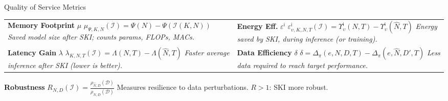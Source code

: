 \documentclass[presentation]{beamer}\mode<presentation>{\usetheme{AMSBolognaFC}}
\begin{document}
\begin{frame}[c]{Quality of Service Metrics~}

    \small
    \vspace{-2ex}
    \begin{tabular}{p{} p{}}
    \textbf{Memory Footprint} $\mu$ \newline
    $\mu_{\Psi, K, N}(\mathcal{I}) = \Psi(N) - \Psi(\mathcal{I}(K, N))$ \newline
    \footnotesize
    \textit{Saved model size after SKI; counts params, FLOPs, MACs.}
    &
    \textbf{Energy Eff.} $\varepsilon^\mathsf{i}$ \newline
    $\varepsilon^\mathsf{i}_{\upsilon, K, N, T}(\mathcal{I}) =
    \Upsilon^{\mathsf{i}}_\upsilon(N, T) - \Upsilon^{\mathsf{i}}_\upsilon(\hat{N}, T)$ \newline
    \footnotesize
    \textit{Energy saved by SKI, during inference (or training).}
    \\
    \textbf{Latency Gain} $\lambda$ \newline
    $\lambda_{K, N, T}(\mathcal{I}) = \Lambda(N, T) - \Lambda(\hat{N}, T)$ \newline
    \footnotesize
    \textit{Faster average inference after SKI (lower is better).}
    &
    \textbf{Data Efficiency} $\delta$ \newline
    $\delta = \Delta_\pi(e,N,D,T) - \Delta_\pi(e,\hat{N},D',T)$ \newline
    \footnotesize
    \textit{Less data required to reach target performance.}
    \end{tabular}
    \vspace{1ex}

    \centering
    \textbf{Robustness} $R_{N, D}(\mathcal{I}) = \frac{\rho_{\hat{N}, D}(\mathcal{D})}{\rho_{N, D}(\mathcal{D})}$ \quad
    {\footnotesize Measures resilience to data perturbations. $R>1$: SKI more robust.}

\end{frame}
\end{document}
